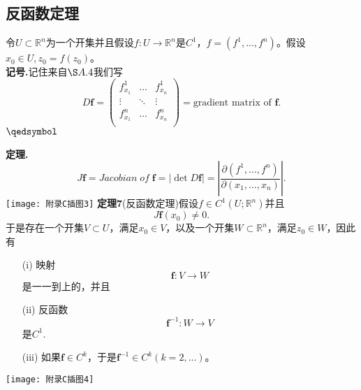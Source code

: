 \documentclass[leqno]{article}%
\begin{document}
\subsection{反函数定理}
令$U\subset\mathbb{R}^{n}$为一个开集并且假设$f:U\rightarrow\mathbb{R}^{n}$是$C^{1}$，$f=(f^{1},...,f^{n})$。假设$x_{0}\in U,z_{0}=f(z_{0})$。\\
\textbf{记号.}记住来自$\S A.4$我们写
\begin{equation*}
D\mathbf{f}=
\begin{pmatrix}
f_{x_{1}}^{1} & \ldots & f_{x_{n}}^{1}\\
\vdots         & \ddots & \vdots\\
f_{x_{1}}^{n} & \ldots & f_{x_{n}}^{n}\\
\end{pmatrix}
=\text{gradient matrix of }\mathbf{f}.
\end{equation*}
$\hfill\qedsymbol$\par
\noindent\textbf{定理.}
\begin{equation*}
J\mathbf{f}=Jacobian\; of \; \mathbf{f}=|\det D\mathbf{f}|=\left|\frac{\partial(f^{1},\ldots,f^{n})}{\partial(x_{1},\ldots,x_{n})}\right|.
\end{equation*}
\texttt{[image: 附录C插图3]}
\textbf{定理7}(反函数定理)假设$f\in C^{1}(U;\mathbb{R}^{n})$并且
\begin{equation*}
J\mathbf{f}(x_{0})\neq 0.
\end{equation*}
于是存在一个开集$V\subset U$，满足$x_{0}\in V$，以及一个开集$W\subset\mathbb{R}^{n}$，满足$z_{0}\in W$，因此有
\begin{enumerate}[fullwidth,itemindent=2em]
	\item[(i)]映射
	\begin{equation*}
	\mathbf{f}:V\rightarrow W
	\end{equation*}
	是一一到上的，并且
	
	\item[(ii)]反函数
	\begin{equation*}
	\mathbf{f}^{-1}:W\rightarrow V
	\end{equation*}
	是$C^{1}$.
	\item[(iii)]如果$\mathbf{f}\in C^{k}$，于是$\mathbf{f}^{-1}\in C^{k}(k=2,...)$。
	 
\end{enumerate}
\texttt{[image: 附录C插图4]}
\end{document}

